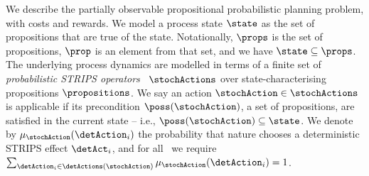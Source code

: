 \documentclass{article}
\begin{document}

We describe the partially observable propositional probabilistic
planning problem, with costs and rewards. We model a process state
$\state$ as the set of propositions that are true of the
state. Notationally, $\props$ is the set of propositions, $\prop$ is
an element from that set, and we have $\state \subseteq
\props$. The underlying process
dynamics are modelled in terms of a finite set of {\em probabilistic
STRIPS operators}~\cite{boutilier:abstraction} $\stochActions$ over
state-characterising propositions $\propositions$.
We say an action $\stochAction \in \stochActions$ is
applicable if its precondition $\poss(\stochAction)$, a set of
propositions, are satisfied in the current state -- i.e., $\poss(\stochAction) \subseteq
\state$. We denote by $\mu_{\stochAction}(\detAction_i)$ the probability that
nature chooses a deterministic STRIPS effect $\detAct_i$, and for
all \stochAction\ we require
$\sum_{\detAction_i \in \detActions(\stochAction)}
\mu_{\stochAction}(\detAction_i) = 1$.

\end{document}
